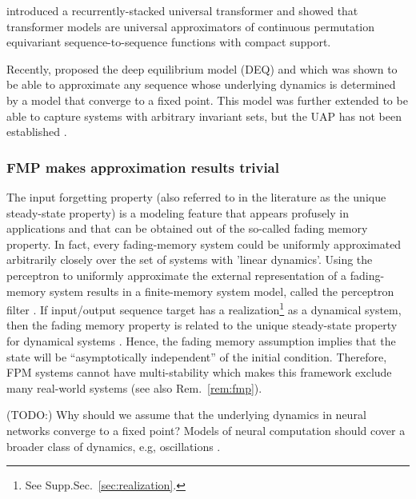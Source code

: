 \documentclass{article}
\newcommand{\ascomment}[1]{\textcolor{ascolor}{(#1)}}
\theoremstyle{definition} \newtheorem{definition}{Definition}
\theoremstyle{remark} \newtheorem{remark}{Remark}
\newcounter{ct}
\begin{document}
 \citet{dehghani2018universal} introduced a recurrently-stacked universal transformer and \citet{yun2019transformers} showed that transformer models are universal approximators of continuous permutation equivariant sequence-to-sequence functions with compact support.


Recently, \citet{bai2019deq} proposed the deep equilibrium model (DEQ) and which was shown to be able to approximate any sequence whose underlying dynamics is determined by a model that converge to a fixed point.
This model was further extended to be able to capture systems with arbitrary invariant sets, but the UAP has not been established \citep{konishi2023stable}. %


\subsubsection{FMP makes approximation results trivial} %
 The input forgetting property (also referred to in the literature as the unique steady-state property) is a modeling feature that appears profusely in applications and that can be obtained out of the so-called fading memory property.
In fact, every fading-memory system could be uniformly approximated arbitrarily closely over the set of systems with 'linear dynamics'\citep{matthews1993approximating}. %
Using the perceptron to uniformly approximate the external representation of a fading-memory system results in a finite-memory system model, called the perceptron filter \citep{matthews1993approximating}.
%
If  input/output sequence target has a realization\footnote{See Supp.Sec.~\ref{sec:realization}.} as a dynamical system, then the fading memory property is related to the unique steady-state property for dynamical systems \citep{chua1976qualitative}.
Hence, the fading memory assumption implies that the state will be “asymptotically independent” of the initial condition.
Therefore, FPM systems cannot have multi-stability which makes this framework exclude many real-world systems (see also Rem.~\ref{rem:fmp}).

\ascomment{TODO:}
Why should we assume that the underlying dynamics in neural networks converge to a fixed point?
Models of neural computation should cover a broader class of dynamics, e.g, oscillations \citep{townley2000existence, kag2020rnns, chang2019antisymmetricrnn,rapp1987periodic}. %
\end{document}
